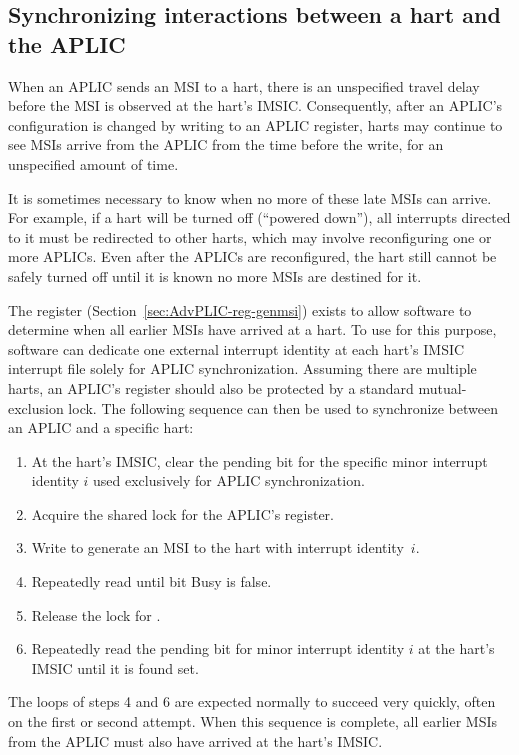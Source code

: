 \subsection{Synchronizing interactions between a hart and the APLIC}
\label{sec:AdvPLIC-MSISync}

When an APLIC sends an MSI to a hart, there is an unspecified travel
delay before the MSI is observed at the hart's IMSIC.
Consequently, after an APLIC's configuration is changed by writing to an
APLIC register, harts may continue to see MSIs arrive from the APLIC from
the time before the write, for an unspecified amount of time.

It is sometimes necessary to know when no more of these late MSIs can
arrive.
For example, if a hart will be turned off (``powered down''), all
interrupts directed to it must be redirected to other harts, which may
involve reconfiguring one or more APLICs.
Even after the APLICs are reconfigured, the hart still cannot be safely
turned off until it is known no more MSIs are destined for it.

The  register (Section~\ref{sec:AdvPLIC-reg-genmsi}) exists
to allow software to determine when all earlier MSIs have arrived at a
hart.
To use  for this purpose, software can dedicate one external
interrupt identity at each hart's IMSIC interrupt file solely for APLIC
synchronization.
Assuming there are multiple harts, an APLIC's  register should
also be protected by a standard mutual-exclusion lock.
The following sequence can then be used to synchronize between an APLIC
and a specific hart:
\begin{enumerate}

\item
At the hart's IMSIC, clear the pending bit for the specific minor
interrupt identity $i$ used exclusively for APLIC synchronization.

\item
Acquire the shared lock for the APLIC's  register.

\item
Write  to generate an MSI to the hart with interrupt
identity~$i$.

\item
Repeatedly read  until bit Busy is false.

\item
Release the lock for .

\item
Repeatedly read the pending bit for minor interrupt identity $i$ at the
hart's IMSIC until it is found set.

\end{enumerate}
The loops of steps 4 and 6 are expected normally to succeed very
quickly, often on the first or second attempt.
When this sequence is complete, all earlier MSIs from the APLIC must
also have arrived at the hart's IMSIC.

